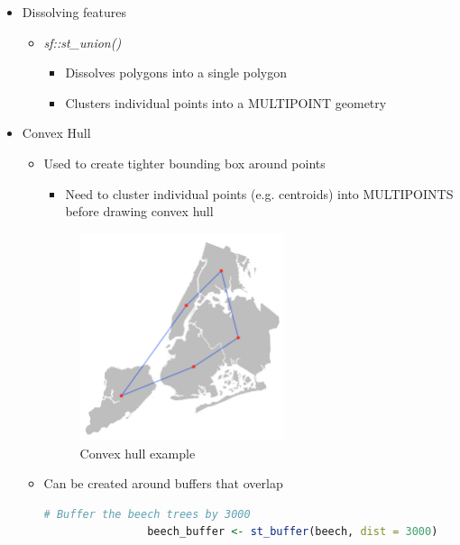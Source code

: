 \documentclass{article}
\begin{document}
\begin{itemize}
\begin{itemize}
\begin{itemize}
\begin{itemize}
            \end{itemize}
        \end{itemize}
        \item Dissolving features
        \begin{itemize}
            \item \textit{sf::st\_union()} 
            \begin{itemize}
                \item Dissolves polygons into a single polygon
                \item Clusters individual points into a MULTIPOINT geometry
            \end{itemize}
        \end{itemize}
        \item Convex Hull
        \begin{itemize}
            \item Used to create tighter bounding box around points
            \begin{itemize}
                \item Need to cluster individual points (e.g. centroids) into MULTIPOINTS before drawing convex hull
            \end{itemize}
            
            \begin{figure}[h]
                \centering
                \caption{Convex hull example}
                \label{convex hull}
                \includegraphics[width=6cm]{convex-hull.png}
            \end{figure} 
            
            \item Can be created around buffers that overlap
            
            \begin{lstlisting}[language=R]
                # Buffer the beech trees by 3000
                beech_buffer <- st_buffer(beech, dist = 3000)


\end{lstlisting}
\end{itemize}
\end{itemize}
\end{itemize}
\end{document}
